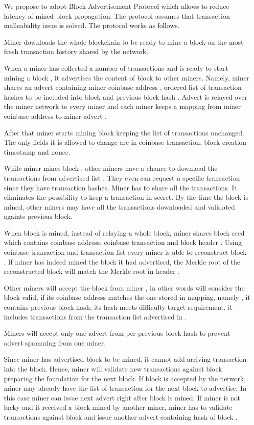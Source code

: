 \documentclass[12pt]{elsarticle}
\begin{document}
We propose to adopt Block Advertisement Protocol which allows to reduce latency of mined block propagation. The protocol assumes that transaction malleabality issue is solved. The protocol works as follows.

Miner downloads the whole blockchain to be ready to mine a block on the most fresh transaction history shared by the network.

When a miner  has collected a number of transactions and is ready to start mining a block , it advertises the content of block  to other miners. Namely, miner  shares an advert  containing miner coinbase address , ordered list of transaction hashes  to be included into block  and previous block hash . Advert  is relayed over the miner network to every miner and each miner keeps a mapping from miner coinbase address  to miner advert .

After that miner  starts mining block  keeping the list of transactions unchanged. The only fields it is allowed to change are  in coinbase transaction, block creation timestamp and nonce.

While miner  mines block , other miners have a chance to download the transactions from advertised list . They even can request a specific transaction since they have transaction hashes. Miner  has to share all the transactions. It eliminates the possibility to keep a transaction in secret. By the time the block is mined, other miners may have all the transactions downloaded and validated againts previous block.

When block  is mined, instead of relaying a whole block, miner  shares block seed  which contains coinbase address, coinbase transaction and block header . Using coinbase transaction and transaction list  every miner is able to reconstruct block . If miner  has indeed mined the block it had advertised, the Merkle root of the reconstructed block will match the Merkle root in header . 

Other miners will accept the block from miner , in other words will consider the block valid, if its coinbase address matches the one stored in mapping, namely , it contains previous block hash, its hash meets difficulty target requirement, it includes transactions from the transaction list  advertised in .

Miners will accept only one advert from  per previous block hash  to prevent advert spamming from one miner.

Since miner  has advertised block  to be mined, it cannot add arriving transaction into the block. Hence, miner  will validate new transactions against block  preparing the foundation for the next block. If block  is accepted by the network, miner  may already have the list of transaction for the next block to advertise. In this case miner  can issue next advert right after block  is mined. If miner  is not lucky and it received a block  mined by another miner, miner  has to validate transactions against block  and issue another advert containing hash of block .
\end{document}
